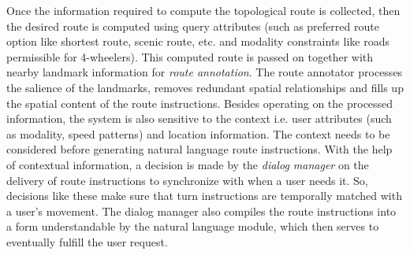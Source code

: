 \documentclass{iitkthesis}
\begin{document}
Once the information required to compute the topological route is 
collected, then the desired route is computed using query attributes 
(such as preferred route option like shortest route, scenic route, etc. 
and modality constraints like roads permissible for 4-wheelers). This 
computed route is passed on together with nearby landmark information for 
\textit{route annotation}. The route annotator processes the salience of 
the landmarks, removes redundant spatial relationships and fills up the 
spatial content of the route instructions. Besides operating on the 
processed information, the system is also sensitive to the context i.e. 
user attributes (such as modality, speed patterns) and location 
information. The context needs to be considered before generating natural 
language route instructions. With the help of contextual information, a 
decision is made by the \textit{dialog manager} on the delivery of route 
instructions to synchronize with when a user needs it. So, 
decisions like these make sure that turn instructions are temporally 
matched with a user's movement. The dialog manager also compiles the route 
instructions into a form understandable by the natural language module, 
which then serves to eventually fulfill the user request.
\end{document}
